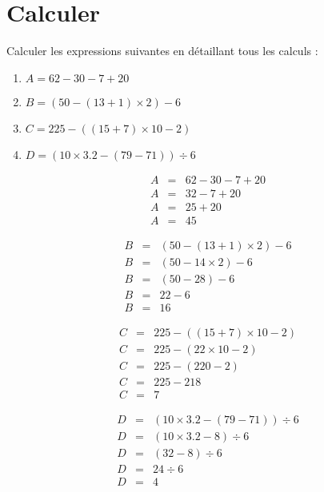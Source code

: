 \section{Calculer}


\begin{questions}
	\question Calculer les expressions suivantes en détaillant tous les calculs :
	
	\begin{enumerate}
		\item $A = 62 - 30 - 7 + 20$
		
		\item $B = (50 - (13 + 1) \times 2) - 6$
		
		\item $C= 225 - ((15 + 7) \times 10 - 2)$
		
		\item $D= (10 \times \num{3.2} - (79 - 71)) \div 6$
	\end{enumerate}
	
	
	\begin{solution}
		
		\begin{multicols}{2}
			
			\begin{eqnarray*}
				A &=& 62 - 30 - 7 + 20 \\
				A &=& 32 - 7 + 20 \\
				A &=& 25 + 20 \\
				A &=& 45
			\end{eqnarray*}
			
			\begin{eqnarray*}
				B &=& (50 - (13 + 1) \times 2) - 6 \\
				B &=& (50 - 14 \times 2) - 6  \\
				B &=& (50 - 28) - 6  \\
				B &=& 22 - 6  \\
				B &=& 16
			\end{eqnarray*}
			
			\begin{eqnarray*}
				C &=& 225 - ((15 + 7) \times 10 - 2)\\
				C &=& 225 - (22 \times 10 - 2) \\
				C &=& 225 - (220 - 2) \\
				C &=& 225 - 218  \\
				C &=& 7
			\end{eqnarray*}
			
			\begin{eqnarray*}
				D &=& (10 \times \num{3.2} - (79 - 71)) \div 6\\
				D &=& (10 \times \num{3.2} - 8) \div 6 \\
				D &=& (32 - 8) \div 6 \\
				D &=& 24 \div 6  \\
				D &=& 4
			\end{eqnarray*}
		\end{multicols}
	\end{solution}
	

\end{questions}
